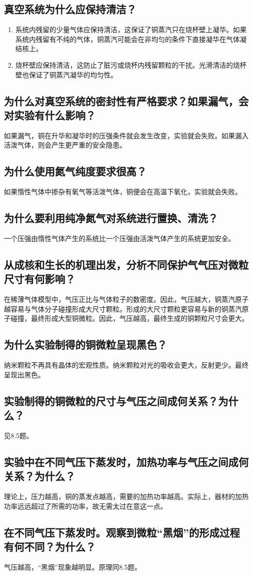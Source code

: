 \documentclass[a4paper]{article}
\begin{document}
\subsection{真空系统为什么应保持清洁？}
\begin{enumerate}
\item 系统内残留的少量气体应保持清洁，这保证了铜蒸汽只在烧杯壁上凝华。如果系统内残留有不纯的气体，铜蒸汽可能会在非均匀的条件下直接凝华在气体凝结核上。
\item 烧杯壁应保持清洁，这防止了脏污或烧杯内残留颗粒的干扰。光滑清洁的烧杯壁也保证了铜蒸汽凝华的均匀性。
\end{enumerate}


\subsection{为什么对真空系统的密封性有严格要求？如果漏气，会对实验有什么影响？}
如果漏气，铜在升华和凝华时的压强条件就会发生改变，实验就会失败。如果漏入活泼气体，则会产生更严重的安全隐患。
\subsection{为什么使用氮气纯度要求很高？}
如果惰性气体中掺杂有氧气等活泼气体，铜便会在高温下氧化，实验就会失败。
\subsection{为什么要利用纯净氮气对系统进行置换、清洗？}
一个压强由惰性气体产生的系统比一个压强由活泼气体产生的系统更加安全。
\subsection{从成核和生长的机理出发，分析不同保护气气压对微粒尺寸有何影响？}
在稀薄气体模型中，气压正比与气体粒子的数密度。因此，气压越大，铜蒸汽原子越容易与气体分子碰撞形成大尺寸颗粒。形成的大尺寸颗粒更容易与新的铜蒸汽原子碰撞，最终形成大型铜微粒。因此，气压越高，最终生成的铜颗粒尺寸会更大。
\subsection{为什么实验制得的铜微粒呈现黑色？}
纳米颗粒不再具有晶体的宏观性质。纳米颗粒对光的吸收会更大，反射更少。最终呈现出黑色。
\subsection{实验制得的铜微粒的尺寸与气压之间成何关系？为什么？}
见8.5题。
\subsection{实验中在不同气压下蒸发时，加热功率与气压之间成何关系？为什么？}
理论上，压力越高，铜的蒸发点越高，需要的加热功率越高。实际上，器材的加热功率远远超过了所需的功率，故无需太过在意这一点。
\subsection{在不同气压下蒸发时。观察到微粒“黑烟”的形成过程有何不同？为什么？}
气压越高，“黑烟”现象越明显。原理同8.5题。

\nocite{jiaocai}

\end{document}
